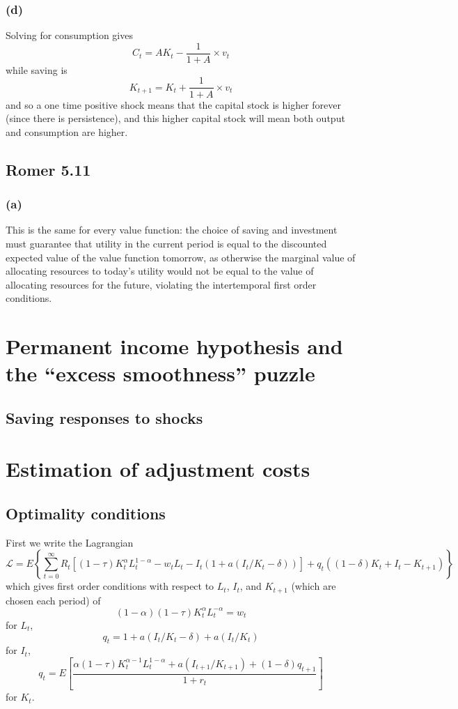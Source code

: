 \documentclass[11pt]{amsart}
\begin{document}
\subsubsection*{(d)}

Solving for consumption gives
\[
C_t = AK_t - \frac{1}{1 + A} \times v_t
\]
while saving is
\[
K_{t+1} = K_t + \frac{1}{1 + A} \times v_t
\]
and so a one time positive shock means that the capital stock is higher forever (since there is persistence), and this higher capital stock will mean both output and consumption are higher.


\subsection{Romer 5.11}

\subsubsection*{(a)}

This is the same for every value function: the choice of saving and investment must guarantee that utility in the current period is equal to the discounted expected value of the value function tomorrow, as otherwise the marginal value of allocating resources to today's utility would not be equal to the value of allocating resources for the future, violating the intertemporal first order conditions.


\section{Permanent income hypothesis and the ``excess smoothness'' puzzle}

\subsection{Saving responses to shocks}

\section{Estimation of adjustment costs}

\subsection{Optimality conditions}

First we write the Lagrangian
\[
\mathcal{L} = E \left\{ \sum_{t=0}^{\infty} R_t \left[(1 - \tau) K_t^{\alpha} L_t^{1-\alpha} - w_t L_t - I_t \left(1 + a(I_t / K_t - \delta) \right) \right] + q_t ((1-\delta) K_t + I_t - K_{t+1}) \right\}
\]
which gives first order conditions with respect to $L_t$, $I_t$, and $K_{t+1}$ (which are chosen each period) of 
\[
(1-\alpha)(1 - \tau) K_t^{\alpha} L_t^{-\alpha} = w_t
\]
for $L_t$, 
\[
q_t = 1 + a(I_t / K_t - \delta) + a(I_t / K_t)
\]
for $I_t$,
\[
q_t = E \left[\frac{\alpha (1-\tau) K_t^{\alpha-1} L_t^{1-\alpha} + a(I_{t+1} / K_{t+1}) + (1-\delta) q_{t+1}}{1 + r_t} \right]
\]
for $K_t$.
\end{document}
